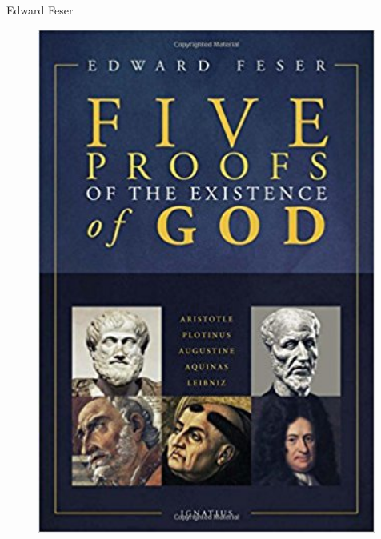 \documentclass[xcolor=dvipsnames]{beamer}
\begin{document}
\begin{frame}{Edward Feser}
\begin{figure}
\begin{columns}
    \includegraphics[width=0.99\textwidth]{five_proofs}
    \centering

\end{columns}
\end{figure}
\end{frame}
\end{document}
